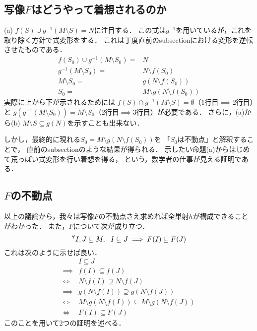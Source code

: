 \documentclass[a4j, 10pt]{jarticle}
\begin{document}
    \subsection{写像$F$はどうやって着想されるのか}
    (a) $f(S) \cup g^{-1}(M \setminus S)=N$に注目する．
    この式は$g^{-1}$を用いているが，これを取り除く方針で式変形をする．
    これは丁度直前のsubsectionにおける変形を逆転させたものである．
    \begin{align*}
        f(S_0) \cup g^{-1}(M \setminus S_0)=&N \\
        g^{-1}(M \setminus S_0)=&N \setminus f(S_0) \\
        M \setminus S_0=&g(N \setminus f(S_0)) \\
        S_0=&M \setminus g(N \setminus f(S_0))
    \end{align*}
    実際に上から下が示されるためには
    $f(S) \cap g^{-1}(M \setminus S)=\emptyset$（$1$行目$\implies$$2$行目）と
    $g(g^{-1}(M \setminus S_0))=M \setminus S_0$（$2$行目$\implies$$3$行目）が必要である．
    さらに，(a)から(b) $M \setminus S \subseteq g(N)$を示すことも出来ない．

    しかし，最終的に現れる$S_0=M \setminus g(N \setminus f(S_0))$を
    「$S_0$は不動点」と解釈することで，
    直前のsubsectionのような結果が得られる．
    示したい命題(a)からはじめて荒っぽい式変形を行い着想を得る，
    という，数学者の仕事が見える証明である．

    \subsection{$F$の不動点}
    以上の議論から，我々は写像$F$の不動点さえ求めれば全単射$h$が構成できることがわかった．
    また，$F$について次が成り立つ．
    \[ {}^{\forall} I,J \subseteq M,~~ I \subseteq J \implies F(I) \subseteq F(J) \]
    これは次のように示せば良い．
    \begin{align*}
        {}&         I \subseteq J \\
        \implies&   f(I) \subseteq f(J) \\
        \iff&       N \setminus f(I) \supseteq N \setminus f(J) \\
        \implies&   g(N \setminus f(I)) \supseteq g(N \setminus f(J)) \\
        \iff&       M \setminus g(N \setminus f(I)) \subseteq M \setminus g(N \setminus f(J)) \\
        \iff&       F(I) \subseteq F(J)
    \end{align*}
    このことを用いて2つの証明を述べる．
\end{document}
